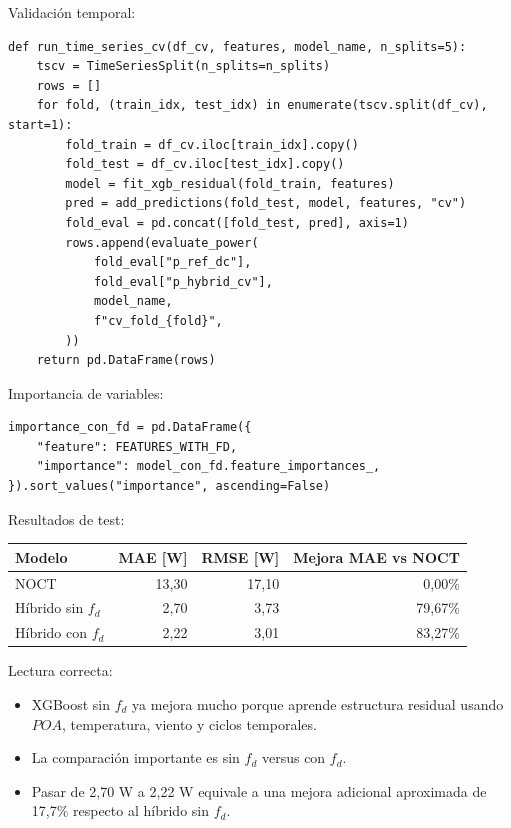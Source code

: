 \documentclass[11pt, letterpaper]{article}
\newcommand{\fd}{f_d}
\begin{document}
Validaci\'on temporal:

\begin{lstlisting}[style=pythonstyle]
def run_time_series_cv(df_cv, features, model_name, n_splits=5):
    tscv = TimeSeriesSplit(n_splits=n_splits)
    rows = []
    for fold, (train_idx, test_idx) in enumerate(tscv.split(df_cv), start=1):
        fold_train = df_cv.iloc[train_idx].copy()
        fold_test = df_cv.iloc[test_idx].copy()
        model = fit_xgb_residual(fold_train, features)
        pred = add_predictions(fold_test, model, features, "cv")
        fold_eval = pd.concat([fold_test, pred], axis=1)
        rows.append(evaluate_power(
            fold_eval["p_ref_dc"],
            fold_eval["p_hybrid_cv"],
            model_name,
            f"cv_fold_{fold}",
        ))
    return pd.DataFrame(rows)
\end{lstlisting}

Importancia de variables:

\begin{lstlisting}[style=pythonstyle]
importance_con_fd = pd.DataFrame({
    "feature": FEATURES_WITH_FD,
    "importance": model_con_fd.feature_importances_,
}).sort_values("importance", ascending=False)
\end{lstlisting}

Resultados de test:

\begin{center}
\begin{tabular}{lrrr}
\toprule
\textbf{Modelo} & \textbf{MAE [W]} & \textbf{RMSE [W]} & \textbf{Mejora MAE vs NOCT} \\
\midrule
NOCT & 13,30 & 17,10 & 0,00\% \\
H\'ibrido sin \(\fd\) & 2,70 & 3,73 & 79,67\% \\
H\'ibrido con \(\fd\) & 2,22 & 3,01 & 83,27\% \\
\bottomrule
\end{tabular}
\end{center}

Lectura correcta:

\begin{itemize}
    \item XGBoost sin \(\fd\) ya mejora mucho porque aprende estructura residual usando \(POA\), temperatura, viento y ciclos temporales.
    \item La comparaci\'on importante es sin \(\fd\) versus con \(\fd\).
    \item Pasar de 2,70 W a 2,22 W equivale a una mejora adicional aproximada de 17,7\% respecto al h\'ibrido sin \(\fd\).
\end{itemize}
\end{document}
